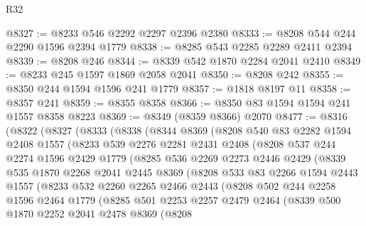 \begin{lexlean}{R32}
\begin{coremodule}
@8327 := @8233 @546 @2292 @2297 @2396 @2380
@8333 := @8208 @544 @244 @2290 @1596 @2394 @1779
@8338 := @8285 @543 @2285 @2289 @2411 @2394
@8339 := @8208 @246
@8344 := @8339 @542 @1870 @2284 @2041 @2410
@8349 := @8233 @245 @1597 @1869 @2058 @2041
@8350 := @8208 @242
@8355 := @8350 @244 @1594 @1596 @241 @1779
@8357 := @1818 @8197 @11
@8358 := @8357 @241
@8359 := @8355 @8358
@8366 := @8350 @83 @1594 @1594 @241 @1557 @8358 @8223
@8369 := @8349 (@8359 @8366) @2070
@8477 := @8316
    (@8322
      (@8327
        (@8333
          (@8338
            (@8344
              @8369
              (@8208
                @540
                @83
                @2282
                @1594
                @2408
                @1557
                (@8233
                  @539
                  @2276
                  @2281
                  @2431
                  @2408
                  (@8208
                    @537
                    @244
                    @2274
                    @1596
                    @2429
                    @1779
                    (@8285
                      @536
                      @2269
                      @2273
                      @2446
                      @2429
                      (@8339
                        @535
                        @1870
                        @2268
                        @2041
                        @2445
                        @8369
                        (@8208
                          @533
                          @83
                          @2266
                          @1594
                          @2443
                          @1557
                          (@8233
                            @532
                            @2260
                            @2265
                            @2466
                            @2443
                            (@8208
                              @502
                              @244
                              @2258
                              @1596
                              @2464
                              @1779
                              (@8285
                                @501
                                @2253
                                @2257
                                @2479
                                @2464
                                (@8339
                                  @500
                                  @1870
                                  @2252
                                  @2041
                                  @2478
                                  @8369
                                  (@8208

\end{coremodule}
\end{lexlean}
